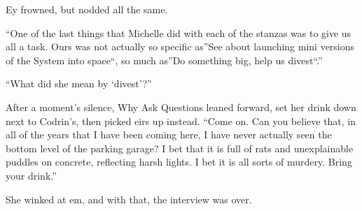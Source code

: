 Ey frowned, but nodded all the same.

``One of the last things that Michelle did with each of the stanzas was to give us all a task. Ours was not actually so specific as''See about launching mini versions of the System into space``, so much as''Do something big, help us divest``.''

``What did she mean by `divest'?''

After a moment's silence, Why Ask Questions leaned forward, set her drink down next to Codrin's, then picked eirs up instead. ``Come on. Can you believe that, in all of the years that I have been coming here, I have never actually seen the bottom level of the parking garage? I bet that it is full of rats and unexplainable puddles on concrete, reflecting harsh lights. I bet it is all sorts of murdery. Bring your drink.''

She winked at em, and with that, the interview was over.
